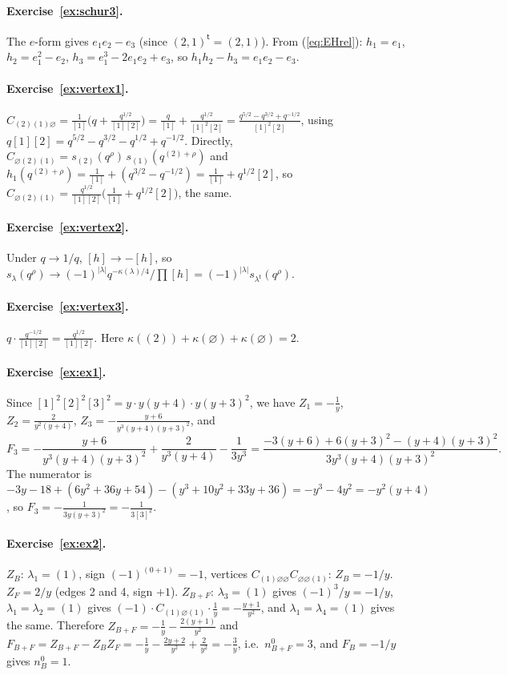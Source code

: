\documentclass[11pt]{article}
\theoremstyle{plain}
\theoremstyle{definition}
\theoremstyle{remark}
\newcommand{\qrho}{q^{\rho}}
\newcommand{\es}{\varnothing}
\newcommand{\tr}{{\mathsf t}}
\newcommand{\lt}[1]{#1^{\tr}}
\begin{document}
\paragraph{Exercise~\ref{ex:schur3}.} The $e$-form gives $e_1e_2-e_3$ (since $\lt{(2,1)}=(2,1)$).
From (\ref{eq:EHrel}): $h_1=e_1$, $h_2=e_1^2-e_2$, $h_3=e_1^3-2e_1e_2+e_3$, so
$h_1h_2-h_3=e_1e_2-e_3$.

\paragraph{Exercise~\ref{ex:vertex1}.} $C_{(2)(1)\es}=\frac1{[1]}\big(q+\frac{q^{1/2}}{[1][2]}\big)
=\frac{q}{[1]}+\frac{q^{1/2}}{[1]^2[2]}=\frac{q^{5/2}-q^{3/2}+q^{-1/2}}{[1]^2[2]}$, using
$q[1][2]=q^{5/2}-q^{3/2}-q^{1/2}+q^{-1/2}$. Directly, $C_{\es(2)(1)}=s_{(2)}(\qrho)\,s_{(1)}(q^{(2)+\rho})$
and $h_1(q^{(2)+\rho})=\frac1{[1]}+(q^{3/2}-q^{-1/2})=\frac1{[1]}+q^{1/2}[2]$, so
$C_{\es(2)(1)}=\frac{q^{1/2}}{[1][2]}\big(\frac1{[1]}+q^{1/2}[2]\big)$, the same.

\paragraph{Exercise~\ref{ex:vertex2}.} Under $q\rightarrow1/q$, $[h]\rightarrow-[h]$, so
$s_\lambda(\qrho)\rightarrow(-1)^{|\lambda|}q^{-\kappa(\lambda)/4}/\prod[h]=(-1)^{|\lambda|}s_{\lt\lambda}(\qrho)$.

\paragraph{Exercise~\ref{ex:vertex3}.} $q\cdot\frac{q^{-1/2}}{[1][2]}=\frac{q^{1/2}}{[1][2]}$.
Here $\kappa((2))+\kappa(\es)+\kappa(\es)=2$.

\paragraph{Exercise~\ref{ex:ex1}.} Since $[1]^2[2]^2[3]^2=y\cdot y(y+4)\cdot y(y+3)^2$, we have
$Z_1=-\frac1y$, $Z_2=\frac2{y^2(y+4)}$, $Z_3=-\frac{y+6}{y^3(y+4)(y+3)^2}$, and
\begin{equation}
F_3=-\frac{y+6}{y^3(y+4)(y+3)^2}+\frac{2}{y^3(y+4)}-\frac1{3y^3}
=\frac{-3(y+6)+6(y+3)^2-(y+4)(y+3)^2}{3y^3(y+4)(y+3)^2}.
\end{equation}
The numerator is $-3y-18+(6y^2+36y+54)-(y^3+10y^2+33y+36)=-y^3-4y^2=-y^2(y+4)$, so
$F_3=-\frac{1}{3y(y+3)^2}=-\frac1{3[3]^2}$.

\paragraph{Exercise~\ref{ex:ex2}.} $Z_B$: $\lambda_1=(1)$, sign $(-1)^{(0+1)}=-1$, vertices
$C_{(1)\es\es}C_{\es\es(1)}$: $Z_B=-1/y$. $Z_F=2/y$ (edges 2 and 4, sign $+1$). $Z_{B+F}$:
$\lambda_3=(1)$ gives $(-1)^{3}/y=-1/y$, $\lambda_1=\lambda_2=(1)$ gives $(-1)\cdot C_{(1)\es(1)}\cdot
\frac1y=-\frac{y+1}{y^2}$, and $\lambda_1=\lambda_4=(1)$ gives the same. Therefore
$Z_{B+F}=-\frac1y-\frac{2(y+1)}{y^2}$ and $F_{B+F}=Z_{B+F}-Z_BZ_F=-\frac1y-\frac{2y+2}{y^2}+\frac2{y^2}
=-\frac3y$, i.e.\ $n^0_{B+F}=3$, and $F_B=-1/y$ gives $n^0_B=1$.
\end{document}
